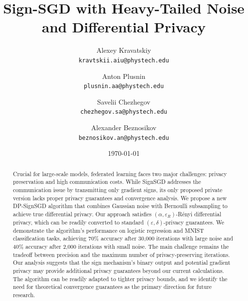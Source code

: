 \documentclass[12pt]{article}
\title{Sign-SGD with Heavy-Tailed Noise and Differential Privacy}
\author{
  Alexey Kravatskiy\\
  \texttt{kravtskii.aiu@phystech.edu}
  \and
  Anton Plusnin\\
  \texttt{plusnin.aa@phystech.edu}
  \and
  Savelii Chezhegov\\
  \texttt{chezhegov.sa@phystech.edu}
  \and
  Alexander Beznosikov\\
  \texttt{beznosikov.an@phystech.edu}
}
\date{\today}
\begin{document}
\maketitle

\begin{abstract}

Crucial for large-scale models, federated learning faces two major challenges: privacy preservation and high communication costs. While SignSGD addresses the communication issue by transmitting only gradient signs, its only proposed private version lacks proper privacy guarantees and convergence analysis. We propose a new DP-SignSGD algorithm that combines Gaussian noise with Bernoulli subsampling to achieve true differential privacy. Our approach satisfies $(\alpha, \varepsilon_R)$-Rényi differential privacy, which can be readily converted to standard $(\varepsilon, \delta)$-privacy guarantees. We demonstrate the algorithm's performance on logistic regression and MNIST classification tasks, achieving 70\% accuracy after 30,000 iterations with large noise and 40\% accuracy after 2,000 iterations with small noise. The main challenge remains the tradeoff between precision and the maximum number of privacy-preserving iterations. Our analysis suggests that the sign mechanism's binary output and potential gradient privacy may provide additional privacy guarantees beyond our current calculations. The algorithm can be readily adapted to tighter privacy bounds, and we identify the need for theoretical convergence guarantees as the primary direction for future research.
\end{abstract}
\end{document}
